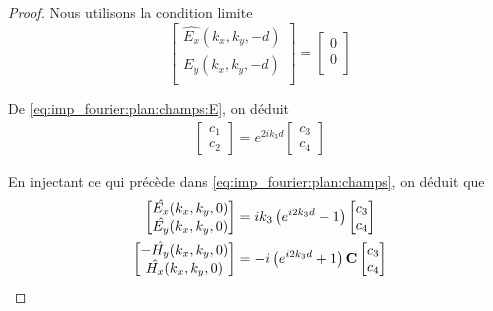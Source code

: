         \begin{proof}
            Nous utilisons la condition limite
            \begin{equation}
                \begin{bmatrix}
                    \hat{E_x}(k_x,k_y,-d)\\
                    \hat{E_y}(k_x,k_y,-d)\\
                \end{bmatrix}
                =
                \begin{bmatrix}
                    0\\
                    0\\
                \end{bmatrix}
            \end{equation}

            De \eqref{eq:imp_fourier:plan:champs:E}, on déduit
            \begin{align}
                \begin{bmatrix}
                    c_1 \\
                    c_2
                \end{bmatrix}
                = e^{2ik_3 d}
                \begin{bmatrix}
                    c_3 \\
                    c_4
                \end{bmatrix}
            \end{align}

            En injectant ce qui précède dans \eqref{eq:imp_fourier:plan:champs}, on déduit que
            \begin{align}
                \begin{bmatrix}
                    \hat{E_x}(k_x,k_y,0)\\
                    \hat{E_y}(k_x,k_y,0)\\
                \end{bmatrix}
                &=ik_3\left( e^{i2k_3 d} -1 \right)
                \begin{bmatrix}
                    c_3 \\
                    c_4
                \end{bmatrix} \\
                \begin{bmatrix}
                    -\hat{H_y}(k_x,k_y,0)\\
                    \hat{H_x}(k_x,k_y,0)\\
                \end{bmatrix}
                & = - i\left(e^{i2k_3 d} +1 \right)
                \mathbf{C}
                \begin{bmatrix}
                c_3 \\
                c_4
                \end{bmatrix}
            \end{align}


\end{proof}
